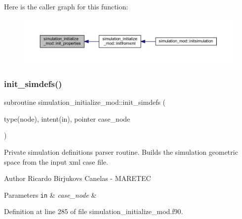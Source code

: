Here is the caller graph for this function\+:\nopagebreak
\begin{figure}[H]
\begin{center}
\leavevmode
\includegraphics[width=350pt]{namespacesimulation__initialize__mod_a7b30af4cf1a6ee74a4b2c6e8c9d1d98d_icgraph}
\end{center}
\end{figure}
\mbox{\label{namespacesimulation__initialize__mod_ae4a495136e5f02724a5cc456d5884281}} 
\subsubsection{\texorpdfstring{init\+\_\+simdefs()}{init\_simdefs()}}
{\footnotesize\ttfamily subroutine simulation\+\_\+initialize\+\_\+mod\+::init\+\_\+simdefs (\begin{DoxyParamCaption}\item[{type(node), intent(in), pointer}]{case\+\_\+node }\end{DoxyParamCaption})\hspace{0.3cm}{\ttfamily [private]}}



Private simulation definitions parser routine. Builds the simulation geometric space from the input xml case file. 

\begin{DoxyAuthor}{Author}
Ricardo Birjukovs Canelas -\/ M\+A\+R\+E\+T\+EC 
\end{DoxyAuthor}

\begin{DoxyParams}[1]{Parameters}
\mbox{\tt in}  & {\em case\+\_\+node} & \\
\hline
\end{DoxyParams}


Definition at line 285 of file simulation\+\_\+initialize\+\_\+mod.\+f90.


